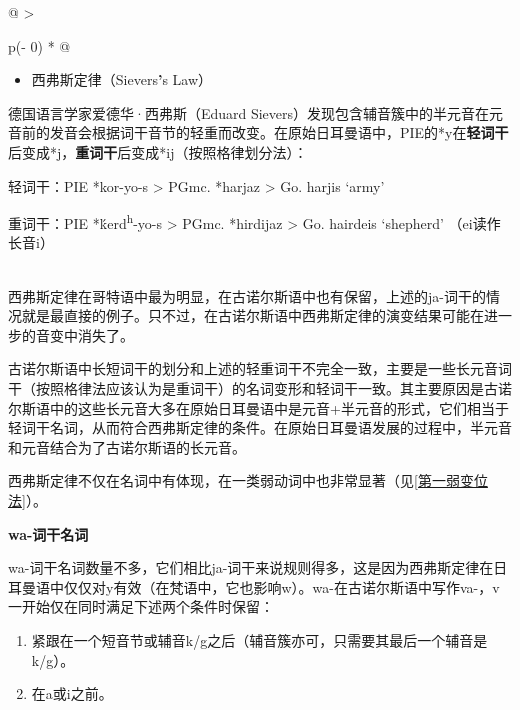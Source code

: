 \begin{longtable}[]{@{}
  >{\raggedright\arraybackslash}p{(\columnwidth - 0\tabcolsep) * }@{}}
  \toprule\noalign{}
  \begin{minipage}[b]{\linewidth}\raggedright
    \begin{itemize}
      \item
            西弗斯定律（Sievers\textbf{'}s Law）
    \end{itemize}

    德国语言学家爱德华·西弗斯（Eduard
    Sievers）发现包含辅音簇中的半元音在元音前的发音会根据词干音节的轻重而改变。在原始日耳曼语中，PIE的*y在\textbf{轻词干}后变成*j，\textbf{重词干}后变成*ij（按照格律划分法）：

    轻词干：PIE *kor-yo-s \textgreater{} PGmc. *harjaz \textgreater{} Go.
    harjis `army'

    重词干：PIE *ḱerd\textsuperscript{h}-yo-s \textgreater{} PGmc. *hirdijaz
    \textgreater{} Go. hairdeis `shepherd' （ei读作长音i）
  \end{minipage} \\
  \midrule\noalign{}
  \endhead
  \bottomrule\noalign{}
  \endlastfoot
  西弗斯定律在哥特语中最为明显，在古诺尔斯语中也有保留，上述的ja-词干的情况就是最直接的例子。只不过，在古诺尔斯语中西弗斯定律的演变结果可能在进一步的音变中消失了。

  古诺尔斯语中长短词干的划分和上述的轻重词干不完全一致，主要是一些长元音词干（按照格律法应该认为是重词干）的名词变形和轻词干一致。其主要原因是古诺尔斯语中的这些长元音大多在原始日耳曼语中是元音+半元音的形式，它们相当于轻词干名词，从而符合西弗斯定律的条件。在原始日耳曼语发展的过程中，半元音和元音结合为了古诺尔斯语的长元音。

  西弗斯定律不仅在名词中有体现，在一类弱动词中也非常显著（见\ref{第一弱变位法}）。                                                                                           \\
\end{longtable}

\textbf{wa-词干名词}

wa-词干名词数量不多，它们相比ja-词干来说规则得多，这是因为西弗斯定律在日耳曼语中仅仅对y有效（在梵语中，它也影响w）。wa-在古诺尔斯语中写作va-，v一开始仅在同时满足下述两个条件时保留：

\begin{enumerate}
  \def\labelenumi{\arabic{enumi})}
  \item
        紧跟在一个短音节或辅音k/g之后（辅音簇亦可，只需要其最后一个辅音是k/g）。
  \item
        在a或i之前。
\end{enumerate}

